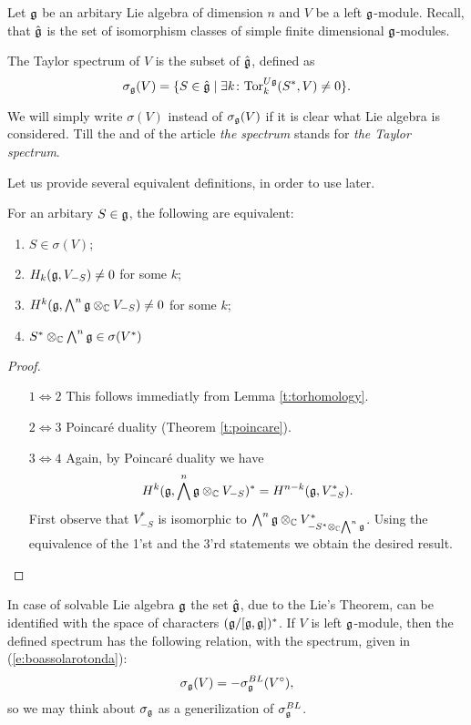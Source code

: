 Let $\mathfrak{g}$ be an arbitary Lie algebra of dimension $n$ and $V$ be a left $\mathfrak{g}$-module.  Recall, that $\hat{\mathfrak{g}}$
is the set of isomorphism classes of simple finite dimensional $\mathfrak{g}$-modules.
\begin{definition}
    The Taylor spectrum of $V$ is the subset of $\hat{\mathfrak{g}}$, defined as
    \[
        \sigma_{\mathfrak{g}}(V)=\{ S\in \hat{\mathfrak{g}} \mid \exists 
            k \colon \mathrm{Tor}^{U\mathfrak{g}}_k(S^*,V)\neq 0\}.
    \]
\end{definition}
We will simply write $\sigma(V)$ instead of $\sigma_{\mathfrak{g}}(V)$ if it is clear what Lie algebra is
considered. Till the and of the article \emph{the spectrum} stands for \emph{the Taylor spectrum}.

Let us provide several equivalent definitions, in order to use later.
\begin{lemma} \label{l:definitions}
   For an arbitary $S\in\mathfrak{g}$, the following are equivalent:
   \begin{enumerate}
       \item $S \in \sigma(V)$; 
           
       \item $H_k(\mathfrak{g}, V_{-S}) \ne 0$ for some $k$; 

       \item $H^k(\mathfrak{g}, \bigwedge^n\mathfrak{g}\otimes_{\mathbb{C}} V_{-S}) \ne 0$ for some $k$;

       \item $S^* \otimes_{\mathbb{C}} \bigwedge^n\mathfrak{g} \in \sigma(V^*)$
   \end{enumerate}
\end{lemma}
\begin{proof}
    \begin{itemize}
        \item[$1 \Leftrightarrow 2$]
            This follows immediatly from Lemma \ref{t:torhomology}.

        \item[$2 \Leftrightarrow 3$]
            Poincar\'e duality (Theorem \ref{t:poincare}).

        \item[$3 \Leftrightarrow 4$]
            Again, by Poincar\'e duality we have
            \[
                H^k(\mathfrak{g}, \bigwedge^n\mathfrak{g} \otimes_{\mathbb{C}} V_{-S})^* = H^{n - k} (\mathfrak{g}, V_{-S}^*).
            \]
            First observe that $V^*_{-S}$ is isomorphic to $\bigwedge^n\mathfrak{g} \otimes_{\mathbb{C}}
            V^*_{-S^* \otimes_{\mathbb{C}} \bigwedge^n\mathfrak{g}}$. Using the equivalence of the 1'st and the
            3'rd statements we obtain the desired result. 
    \end{itemize}
\end{proof}
    In case of solvable Lie algebra $\mathfrak{g}$ the set $\hat{\mathfrak{g}}$, due to the Lie's Theorem, can be
    identified with the space of characters $(\mathfrak{g}/[\mathfrak{g}, \mathfrak{g}])^*$. If $V$ is left
    $\mathfrak{g}$-module, then the defined spectrum has the following relation, with the spectrum, given
    in (\ref{e:boassolarotonda}):
    \[
        \sigma_{\mathfrak{g}}(V) = -\sigma^{BL}_{\mathfrak{g}}(V^\circ),
    \]
    so we may think about $\sigma_{\mathfrak{g}}$ as a generilization of $\sigma^{BL}_{\mathfrak{g}}$.
